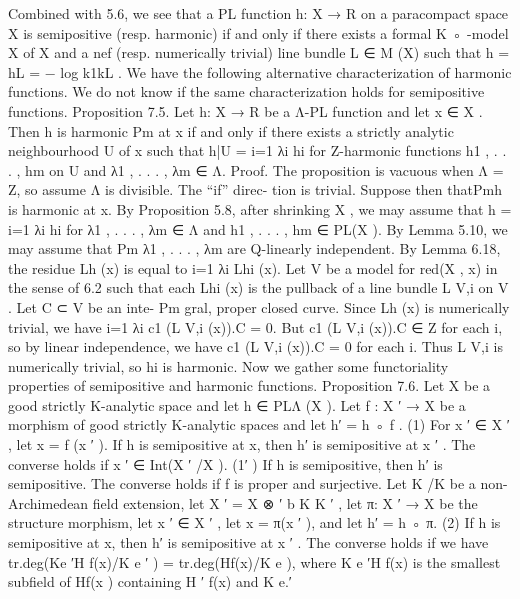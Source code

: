 \documentclass[
  10pt,
]{article}
\newenvironment{Shaded}{}{}
\newcommand{\NormalTok}[1]{#1}
\begin{document}
\begin{Shaded}
\begin{Highlighting}[]
\NormalTok{  Combined with 5.6, we see that a PL function h: X → R on a paracompact space X is}
\NormalTok{semipositive (resp. harmonic) if and only if there exists a formal K ◦ {-}model X of X and a}
\NormalTok{nef (resp. numerically trivial) line bundle L ∈ M (X) such that h = hL = − log k1kL .}
\NormalTok{  We have the following alternative characterization of harmonic functions. We do not}
\NormalTok{know if the same characterization holds for semipositive functions.}
\NormalTok{Proposition 7.5. Let h: X → R be a Λ{-}PL function and let x ∈ X . Then h is harmonic Pm at x}
\NormalTok{if and only if there exists a strictly analytic neighbourhood U of x such that h|U = i=1 λi hi}
\NormalTok{for Z{-}harmonic functions h1 , . . . , hm on U and λ1 , . . . , λm ∈ Λ.}
\NormalTok{Proof. The proposition is vacuous when Λ = Z, so assume Λ is divisible. The “if” direc{-}}
\NormalTok{tion is trivial. Suppose then thatPmh is harmonic at x. By Proposition 5.8, after shrinking}
\NormalTok{X , we may assume that h = i=1 λi hi for λ1 , . . . , λm ∈ Λ and h1 , . . . , hm ∈ PL(X ). By}
\NormalTok{Lemma 5.10, we may assume that   Pm λ1 , . . . , λm are Q{-}linearly independent. By Lemma 6.18,}
\NormalTok{the residue Lh (x) is equal to i=1 λi Lhi (x). Let V be a model for red(X , x) in the sense}
\NormalTok{of 6.2 such that each Lhi (x) is the pullback of a line bundle L V,i on V . Let C ⊂ V be an inte{-}}
\NormalTok{                                                                            Pm}
\NormalTok{gral, proper closed curve. Since Lh (x) is numerically trivial, we have i=1 λi c1 (L V,i (x)).C =}
\NormalTok{0. But c1 (L V,i (x)).C ∈ Z for each i, so by linear independence, we have c1 (L V,i (x)).C = 0}
\NormalTok{for each i. Thus L V,i is numerically trivial, so hi is harmonic.                              }
\NormalTok{     Now we gather some functoriality properties of semipositive and harmonic functions.}
\NormalTok{Proposition 7.6. Let X be a good strictly K{-}analytic space and let h ∈ PLΛ (X ).}
\NormalTok{   Let f : X ′ → X be a morphism of good strictly K{-}analytic spaces and let h′ = h ◦ f .}
\NormalTok{     (1) For x ′ ∈ X ′ , let x = f (x ′ ). If h is semipositive at x, then h′ is semipositive at x ′ .}
\NormalTok{           The converse holds if x ′ ∈ Int(X ′ /X ).}
\NormalTok{    (1′ ) If h is semipositive, then h′ is semipositive. The converse holds if f is proper and}
\NormalTok{           surjective.}
\NormalTok{Let K /K be a non{-}Archimedean field extension, let X ′ = X ⊗}
\NormalTok{       ′                                                             b K K ′ , let π: X ′ → X be the}
\NormalTok{structure morphism, let x ′ ∈ X ′ , let x = π(x ′ ), and let h′ = h ◦ π.}
\NormalTok{     (2) If h is semipositive at x, then h′ is semipositive at x ′ . The converse holds if we have}
\NormalTok{           tr.deg(Ke ′H  f(x)/K}
\NormalTok{                              e ′ ) = tr.deg(Hf(x)/K e ), where K}
\NormalTok{                                                                e ′H}
\NormalTok{                                                                   f(x) is the smallest subfield of}
\NormalTok{           Hf(x ) containing H}
\NormalTok{                 ′                f(x) and K e.′}


\end{Highlighting}
\end{Shaded}
\end{document}
